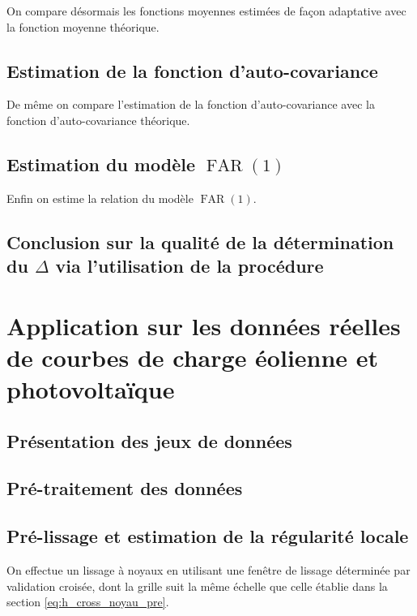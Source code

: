 On compare désormais les fonctions moyennes estimées de façon adaptative avec la fonction moyenne théorique.

\subsection{Estimation de la fonction d'auto-covariance}

De même on compare l'estimation de la fonction d'auto-covariance avec la fonction d'auto-covariance théorique.

\subsection{Estimation du modèle $\operatorname{FAR}(1)$}

Enfin on estime la relation du modèle $\operatorname{FAR}(1)$.


\subsection{Conclusion sur la qualité de la détermination du $\Delta$ via l'utilisation de la procédure}

\section{
  Application sur les données réelles de courbes de charge éolienne et photovoltaïque
 }

\subsection{Présentation des jeux de données}

\subsection{Pré-traitement des données}

\subsection{Pré-lissage et estimation de la régularité locale}

On effectue un lissage à noyaux en utilisant une fenêtre de lissage déterminée par validation croisée, dont la grille suit la même échelle que celle établie dans la section \ref{eq:h_cross_noyau_pre}.


